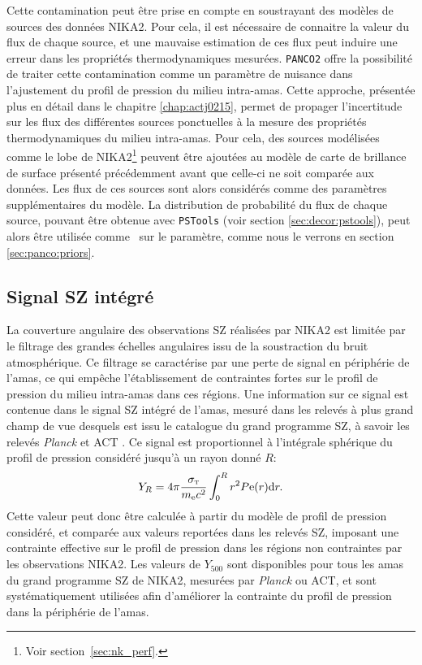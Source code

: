 Cette contamination peut être prise en compte en soustrayant des modèles de sources des données NIKA2.
Pour cela, il est nécessaire de connaitre la valeur du flux de chaque source, et une mauvaise estimation de ces flux peut induire une erreur dans les propriétés thermodynamiques mesurées.
\texttt{PANCO2} offre la possibilité de traiter cette contamination comme un paramètre de nuisance dans l'ajustement du profil de pression du milieu intra-amas.
Cette approche, présentée plus en détail dans le chapitre \ref{chap:actj0215}, permet de propager l'incertitude sur les flux des différentes sources ponctuelles à la mesure des propriétés thermodynamiques du milieu intra-amas.
Pour cela, des sources modélisées comme le lobe de NIKA2\footnote{Voir section~\ref{sec:nk_perf}.} peuvent être ajoutées au modèle de carte de brillance de surface présenté précédemment avant que celle-ci ne soit comparée aux données.
Les flux de ces sources sont alors considérés comme des paramètres supplémentaires du modèle.
La distribution de probabilité du flux de chaque source, pouvant être obtenue avec \texttt{PSTools} (voir section \ref{sec:decor:pstools}), peut alors être utilisée comme \prior\ sur le paramètre, comme nous le verrons en section \ref{sec:panco:priors}.

\subsection{Signal SZ intégré}

La couverture angulaire des observations SZ réalisées par NIKA2 est limitée par le filtrage des grandes échelles angulaires issu de la soustraction du bruit atmosphérique.
Ce filtrage se caractérise par une perte de signal en périphérie de l'amas, ce qui empêche l'établissement de contraintes fortes sur le profil de pression du milieu intra-amas dans ces régions.
Une information sur ce signal est contenue dans le signal SZ intégré de l'amas, mesuré dans les relevés à plus grand champ de vue desquels est issu le catalogue du grand programme SZ, à savoir les relevés \textit{Planck} \cite{planck_collaboration_planck_2016-3} et ACT \cite{hasselfield_atacama_2013}.
Ce signal est proportionnel à l'intégrale sphérique du profil de pression considéré jusqu'à un rayon donné $R$:
\begin{equation}
    Y_R = 4 \pi \frac{\sigma_\textsc{t}}{m_{\rm e} c^2} \int_0^R r^2 P{\rm e}(r) \mathrm{d} r.
\end{equation}
Cette valeur peut donc être calculée à partir du modèle de profil de pression considéré, et comparée aux valeurs reportées dans les relevés SZ, imposant une contrainte effective sur le profil de pression dans les régions non contraintes par les observations NIKA2.
Les valeurs de $Y_{500}$ sont disponibles pour tous les amas du grand programme SZ de NIKA2, mesurées par \textit{Planck} ou ACT, et sont systématiquement utilisées afin d'améliorer la contrainte du profil de pression dans la périphérie de l'amas.

